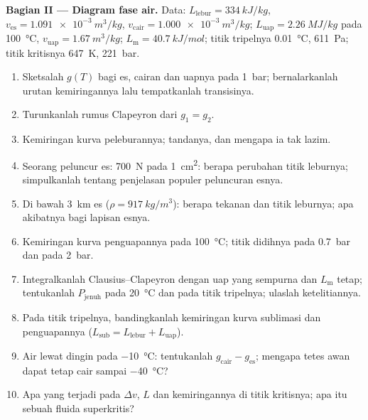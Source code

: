 \begin{problem}
\textbf{Bagian II --- Diagram fase air.}
Data: $L_{\text{lebur}} = \qty{334}{kJ/kg}$, $v_{\text{es}} = \qty{1.091e-3}{m^3/kg}$,
$v_{\text{cair}} = \qty{1.000e-3}{m^3/kg}$; $L_{\text{uap}} = \qty{2.26}{MJ/kg}$ pada
\qty{100}{\celsius}, $v_{\text{uap}} = \qty{1.67}{m^3/kg}$; $L_{\text{m}} = \qty{40.7}{kJ/mol}$;
titik tripelnya \qty{0.01}{\celsius}, \qty{611}{Pa}; titik kritisnya \qty{647}{K},
\qty{221}{bar}.
\begin{enumerate}[resume]
  \item Sketsalah $g(T)$ bagi es, cairan dan uapnya pada \qty{1}{bar}; bernalarkanlah
        urutan kemiringannya lalu tempatkanlah transisinya.
  \item Turunkanlah rumus Clapeyron dari $g_1 = g_2$.
  \item Kemiringan kurva peleburannya; tandanya, dan mengapa ia tak lazim.
  \item Seorang peluncur es: \qty{700}{N} pada \qty{1}{cm^2}: berapa perubahan titik
        leburnya; simpulkanlah tentang penjelasan populer peluncuran esnya.
  \item Di bawah \qty{3}{km} es ($\rho = \qty{917}{kg/m^3}$): berapa tekanan dan
        titik leburnya; apa akibatnya bagi lapisan esnya.
  \item Kemiringan kurva penguapannya pada \qty{100}{\celsius}; titik didihnya
        pada \qty{0.7}{bar} dan pada \qty{2}{bar}.
  \item Integralkanlah Clausius--Clapeyron dengan uap yang sempurna dan
        $L_{\text{m}}$ tetap; tentukanlah $P_{\text{jenuh}}$ pada \qty{20}{\celsius} dan pada
        titik tripelnya; ulaslah ketelitiannya.
  \item Pada titik tripelnya, bandingkanlah kemiringan kurva sublimasi dan
        penguapannya ($L_{\text{sub}} = L_{\text{lebur}} + L_{\text{uap}}$).
  \item Air lewat dingin pada \qty{-10}{\celsius}: tentukanlah $g_{\text{cair}} - g_{\text{es}}$;
        mengapa tetes awan dapat tetap cair sampai \qty{-40}{\celsius}?
  \item Apa yang terjadi pada $\Delta v$, $L$ dan kemiringannya di titik
        kritisnya; apa itu sebuah fluida superkritis?
\end{enumerate}


\end{problem}

